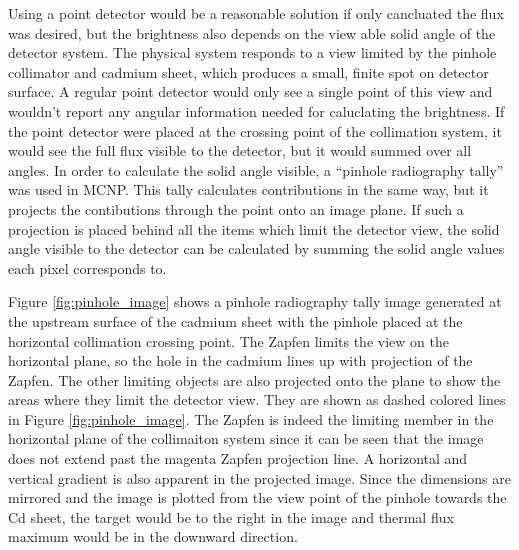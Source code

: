 \documentclass[preprint,12pt]{elsarticle}
\begin{document}
Using a point detector would be a reasonable solution if only cancluated the flux was desired, but the brightness also depends on the view able solid angle of the detector system.   The physical system responds to a view limited by the pinhole collimator and cadmium sheet, which produces a small, finite spot on detector surface.  A regular point detector would only see a single point of this view and wouldn't report any angular information needed for caluclating the brightness.  If the point detector were placed at the crossing point of the collimation system, it would see the full flux visible to the detector, but it would summed over all angles.  In order to calculate the solid angle visible, a ``pinhole radiography tally'' was used in MCNP.  This tally calculates contributions in the same way, but it projects the contibutions through the point onto an image plane.  If such a projection is placed behind all the items which limit the detector view, the solid angle visible to the detector can be calculated by summing the solid angle values each pixel corresponds to.

Figure \ref{fig:pinhole_image} shows a pinhole radiography tally image generated at the upstream surface of the cadmium sheet with the pinhole placed at the horizontal collimation crossing point.  The Zapfen limits the view on the horizontal plane, so the hole in the cadmium lines up with projection of the Zapfen.  The other limiting objects are also projected onto the plane to show the areas where they limit the detector view.  They are shown as dashed colored lines in Figure \ref{fig:pinhole_image}.  The Zapfen is indeed the limiting member in the horizontal plane of the collimaiton system since it can be seen that the image does not extend past the magenta Zapfen projection line.  A horizontal and vertical gradient is also apparent in the projected image.  Since the dimensions are mirrored and the image is plotted from the view point of the pinhole towards the Cd sheet, the target would be to the right in the image and thermal flux maximum would be in the downward direction. 
\end{document}
